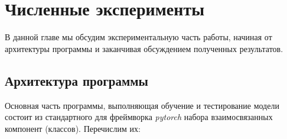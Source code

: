 \section{Численные эксперименты}

\indent
\indent
В данной главе мы обсудим экспериментальную часть работы, начиная от
архитектуры программы и заканчивая обсуждением полученных результатов.



\subsection{Архитектура программы}

\indent
\indent
Основная часть программы, выполняющая обучение и тестирование модели
 состоит из стандартного для фреймворка \textit{pytorch} набора 
 взаимосвязанных компонент (классов). Перечислим их:


